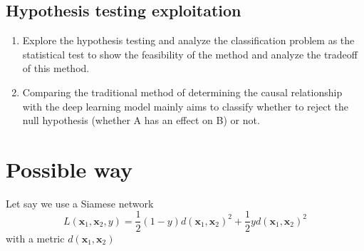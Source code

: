 \documentclass{article}
\begin{document}
\subsection{Hypothesis testing exploitation}
\begin{enumerate}
    \item Explore the hypothesis testing and analyze the classification problem as the statistical test to show the feasibility of the method and analyze the tradeoff of this method.
    \item Comparing the traditional method of determining the causal relationship with the deep learning model mainly aims to classify whether to reject the null hypothesis (whether A has an effect on B) or not.
\end{enumerate}

\section{Possible way}

Let say we use a Siamese network
$$L(\mathbf{x}_1, \mathbf{x}_2, y) = \frac{1}{2}(1-y)d(\mathbf{x}_1, \mathbf{x}_2)^2 + \frac{1}{2}yd(\mathbf{x}_1, \mathbf{x}_2)^2
$$
with a metric $d(\mathbf{x}_1, \mathbf{x}_2)$

\end{document}
